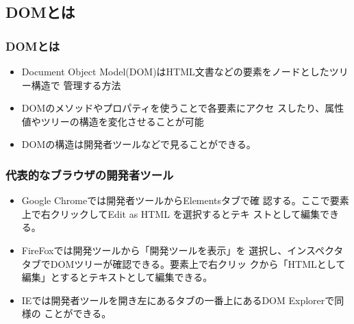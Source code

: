 \subsection{DOMとは}
\begin{frame}[containsverbatim]
 \frametitle{DOMとは}
\begin{itemize}
 \item Document Object Model(DOM)はHTML文書などの要素をノードとしたツリー構造で
管理する方法
 \item DOMのメソッドやプロパティを使うことで各要素にアクセ
スしたり、属性値やツリーの構造を変化させることが可能
 \item DOMの構造は開発者ツールなどで見ることができる。
\end{itemize}
\end{frame}
\begin{frame}[containsverbatim]
 \frametitle{代表的なブラウザの開発者ツール}
\begin{itemize}
 \item  Google Chromeでは開発者ツールからElementsタブで確
       認する。ここで要素上で右クリックしてEdit as HTML を選択するとテキ
       ストとして編集できる。
 \item FireFoxでは開発ツールから「開発ツールを表示」を
       選択し、インスペクタタブでDOMツリーが確認できる。要素上で右クリッ
       クから「HTMLとして編集」とするとテキストとして編集できる。
 \item IEでは開発者ツールを開き左にあるタブの一番上にあるDOM Explorerで同様の
       ことができる。
\end{itemize}
\end{frame}
